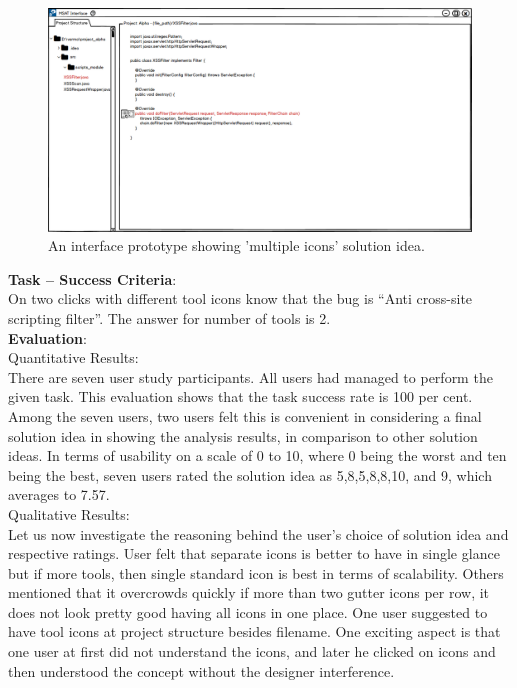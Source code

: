 \begin{figure}[hbt!]
	\centering
	\includegraphics[width=\linewidth]{figures/solution_ideas_snaps/S21_multiple_icons}
	\caption{An interface prototype showing 'multiple icons' solution idea.}
	\label{fig:S21_multiple_icons}
\end{figure}

\textbf{Task – Success Criteria}: \\

On two clicks with different tool icons know that the bug is “Anti cross-site scripting filter”. The answer for number of tools is 2. \\

\textbf{Evaluation}: \\

Quantitative Results: \\

There are seven user study participants. All users had managed to perform the given task. This evaluation shows that the task success rate is 100 per cent. \\

Among the seven users, two users felt this is convenient in considering a final solution idea in showing the analysis results, in comparison to other solution ideas. In terms of usability on a scale of 0 to 10, where 0 being the worst and ten being the best, seven users rated the solution idea as 5,8,5,8,8,10, and 9, which averages to 7.57. \\

Qualitative Results: \\

Let us now investigate the reasoning behind the user’s choice of solution idea and respective ratings. User felt that separate icons is better to have in single glance but if more tools, then single standard icon is best in terms of scalability. Others mentioned that it overcrowds quickly if more than two gutter icons per row, it does not look pretty good having all icons in one place. One user suggested to have tool icons at project structure besides filename. One exciting aspect is that one user at first did not understand the icons, and later he clicked on icons and then understood the concept without the designer interference. \\

